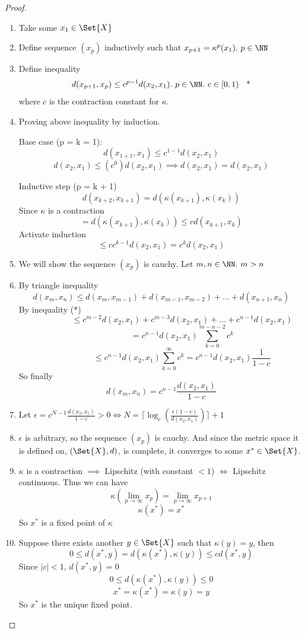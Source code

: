 \begin{proof}
  \begin{enumerate}
  \item Take some $x_1 \in \Set{X}$
  \item Define sequence $(x_p)$ inductively such that $x_{p+1} = \kappa^p(x_1).\ p \in \NN$
  \item Define inequality
    $$d(x_{p+1}, x_p) \leq c^{p-1}d(x_2, x_1).\ p \in \NN.\ c \in [0, 1) \:\:\:\: \text{*}$$ 
    where $c$ is the contraction constant for $\kappa$. 
  \item Proving above inequality by induction.
    \par Base case (p = k = 1):
    $$d(x_{1+1}, x_1) \leq c^{1-1}d(x_2, x_1)$$
    $$d(x_2, x_1) \leq (c^0)d(x_2, x_1) \implies d(x_2, x_1) = d(x_2, x_1)$$
    \par Inductive step (p = k + 1)
    $$d(x_{k+2}, x_{k+1}) = d(\kappa(x_{k+1}), \kappa(x_{k}))$$
    Since $\kappa$ is a contraction
    $$ = d(\kappa(x_{k+1}), \kappa(x_k)) \leq cd(x_{k+1}, x_k)$$
    Activate induction
    $$ \leq cc^{k-1}d(x_2, x_1) = c^kd(x_2, x_1)$$
  \item We will show the sequence $(x_p)$ is cauchy. Let $m, n \in \NN.\ m > n$
  \item By triangle inequality
    $$d(x_m, x_n) \leq d(x_m, x_{m-1}) + d(x_{m-1}, x_{m-2}) + \dots + d(x_{n+1}, x_n)$$
    By inequality (*)
    $$\phantom{d(x_m, x_n) } \leq c^{m-2}d(x_2, x_1)+c^{m-3}d(x_2, x_1)+\dots + c^{n-1}d(x_2, x_1)$$
    $$\phantom{d(x_m, x_n) } = c^{n-1}d(x_2, x_1)\sum_{k=0}^{m-n-2}c^k$$
    $$\phantom{d(x_m, x_n) } \leq c^{n-1}d(x_2, x_1)\sum_{k=0}^{\infty}c^k = c^{n-1}d(x_2, x_1)\frac{1}{1-c}$$
    So finally
    $$d(x_m, x_n) = c^{n-1}\frac{d(x_2, x_1)}{1-c}$$
  \item Let $\epsilon = c^{N-1}\frac{d(x_2, x_1)}{1-c} > 0 \iff N = \lceil \log_c(\frac{\epsilon(1-c)}{d(x_2, x_1)})\rceil + 1$
  \item $\epsilon$ is arbitrary, so the sequence $(x_p)$ is cauchy. And since the metric space it is defined on, $(\Set{X}, d)$, is complete, it converges to some $x^* \in \Set{X}$.
  \item $\kappa$ is a contraction $\implies$ Lipschitz (with constant $< 1$) $\iff$ Lipschitz continuous. Thus we can have
    $$\kappa(\lim_{p\rightarrow \infty}x_p) = \lim_{p\rightarrow \infty}x_{p+1}$$
    $$\kappa(x^*) = x^*$$
    So $x^*$ is a fixed point of $\kappa$
  \item Suppose there exists another $y \in \Set{X}$ such that $\kappa(y) = y$, then
    $$0 \leq d(x^*, y) = d(\kappa(x^*), \kappa(y)) \leq cd(x^*, y)$$
    Since $|c| < 1$, $d(x^*, y) = 0$
    $$0 \leq d(\kappa(x^*), \kappa(y)) \leq 0$$
    $$x^* = \kappa(x^*) = \kappa(y) = y$$
    So $x^*$ is the unique fixed point.
  \end{enumerate}
\end{proof}

